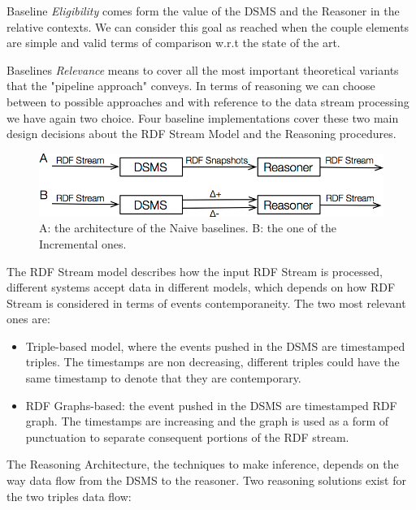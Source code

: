 Baseline \textit{Eligibility} comes form the value of the DSMS and the Reasoner in the relative contexts. We can consider this goal as reached when the couple elements are simple and valid terms of comparison w.r.t the state of the art.

Baselines \textit{Relevance} means to cover all the most important theoretical variants that the "pipeline approach" conveys. In terms of reasoning we can choose between to possible approaches and with reference to the data stream processing we have again two choice. Four baseline implementations cover these two main design decisions about the RDF Stream Model and the Reasoning procedures. 

\pagebreak

\begin{figure}[tbh]
  \centering
	\includegraphics[width=\linewidth]{images/baselines-final}
	\caption{A: the architecture of the Naive baselines. B: the one of  the Incremental ones.} 
  	\label{fig:baselines}
\end{figure}

The RDF Stream model describes how the input RDF Stream is processed, different systems accept data in different models, which depends on how RDF Stream is considered in terms of events contemporaneity. The two most relevant ones are:

\begin{itemize}	
\item Triple-based model, where the events pushed in the DSMS are timestamped triples. The timestamps are non decreasing, different triples could have the same timestamp to denote that they are contemporary.
\item RDF Graphs-based: the event pushed in the DSMS are timestamped RDF graph. The timestamps are increasing and the graph is used as a form of punctuation \cite{Tatbul2003b} to separate consequent portions of the RDF stream.
\end{itemize}

The Reasoning Architecture, the techniques to make inference, depends on the way data flow from the DSMS to the reasoner. Two reasoning solutions exist for the two triples data flow:

